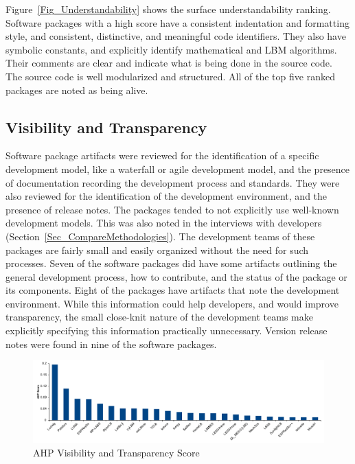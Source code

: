 \documentclass[final, 3p, times, authoryear]{elsarticle}
\begin{document}
Figure~\ref{Fig_Understandability} shows the surface understandability ranking.
Software packages with a high score have a consistent indentation and formatting
style, and consistent, distinctive, and meaningful code identifiers. They also
have symbolic constants, and explicitly identify mathematical and LBM
algorithms. Their comments are clear and indicate what is being done in the
source code. The source code is well modularized and structured. All of the top
five ranked packages are noted as being alive.

\subsection{Visibility and Transparency}

Software package artifacts were reviewed for the identification of a specific
development model, like a waterfall or agile development model, and the presence
of documentation recording the development process and standards. They were also
reviewed for the identification of the development environment, and the presence
of release notes. The packages tended to not explicitly use well-known
development models. This was also noted in the interviews with developers
(Section~\ref{Sec_CompareMethodologies}). The development teams of these
packages are fairly small and easily organized without the need for such
processes. Seven of the software packages did have some artifacts outlining the
general development process, how to contribute, and the status of the package or
its components. Eight of the packages have artifacts that note the development
environment. While this information could help developers, and would improve
transparency, the small close-knit nature of the development teams make
explicitly specifying this information practically unnecessary. Version
release notes were found in nine of the software packages.

\begin{figure}[h!]
	\begin{center}
		\includegraphics[width=1.0\textwidth]{./figures/visibilitytransparency_chart.pdf}
		\caption{AHP Visibility and Transparency Score}
		\label{Fig_VisibilityTransparency}
	\end{center}
\end{figure}
\end{document}
